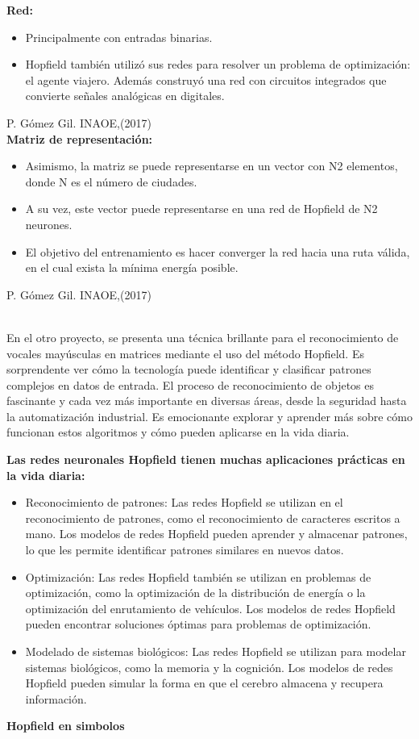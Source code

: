\documentclass{article}
\begin{document}
\textbf{Red:}
\begin{itemize}
    \item Principalmente con entradas binarias.
    \item Hopfield también utilizó sus redes para resolver un
problema de optimización: el agente viajero. Además
construyó una red con circuitos integrados que convierte
señales analógicas en digitales. 
\end{itemize}
\textsf{P. Gómez Gil. INAOE,(2017)}
\\
\newpage
\textbf{Matriz de representación:}
\begin{itemize}
    \item Asimismo, la matriz se puede representarse
en un vector con N2 elementos, donde N es
el número de ciudades.
    \item A su vez, este vector puede representarse en
una red de Hopfield de N2 neurones.
    \item El objetivo del entrenamiento es hacer
converger la red hacia una ruta válida, en el
cual exista la mínima energía posible.  
\end{itemize}
\textsf{P. Gómez Gil. INAOE,(2017)}

\\En el otro proyecto, se presenta una técnica brillante para el reconocimiento de vocales mayúsculas en matrices mediante el uso del método Hopfield. Es sorprendente ver cómo la tecnología puede identificar y clasificar patrones complejos en datos de entrada. El proceso de reconocimiento de objetos es fascinante y cada vez más importante en diversas áreas, desde la seguridad hasta la automatización industrial. Es emocionante explorar y aprender más sobre cómo funcionan estos algoritmos y cómo pueden aplicarse en la vida diaria.



\textbf{Las redes neuronales Hopfield tienen muchas aplicaciones
prácticas en la vida diaria:}
\begin{itemize}
    \item Reconocimiento de patrones: Las redes Hopfield se utilizan en el reconocimiento de patrones, como el reconocimiento de caracteres escritos a mano. Los modelos de redes Hopfield pueden aprender y almacenar patrones, lo que les permite identificar patrones similares en nuevos datos.
    \item Optimización: Las redes Hopfield también se utilizan en problemas de optimización, como la optimización de la distribución de energía o la optimización del enrutamiento de vehículos. Los modelos de redes Hopfield pueden encontrar soluciones óptimas para problemas de optimización.
    \item Modelado de sistemas biológicos: Las redes Hopfield se utilizan para modelar sistemas biológicos, como la memoria y la cognición. Los modelos de redes Hopfield pueden simular la forma en que el cerebro almacena y recupera información.
\end{itemize}
\textbf{Hopfield en simbolos}
\\
\end{document}
